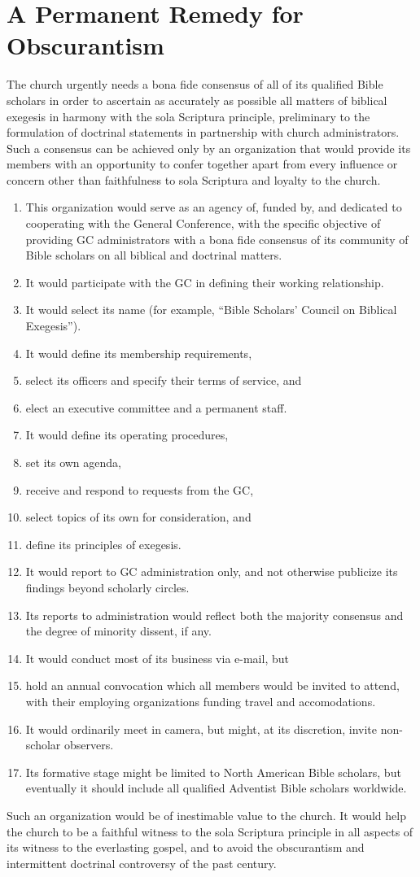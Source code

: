 \chapter{A Permanent Remedy for Obscurantism}
\label{ch:remedy}

The church urgently needs a bona fide consensus of all of its qualified
Bible scholars in order to ascertain as accurately as possible all matters
of biblical exegesis in harmony with the sola Scriptura principle, 
preliminary to the formulation of doctrinal statements in partnership with
church administrators. Such a consensus can be achieved only by an
organization that would provide its members with an opportunity to confer
together apart from every influence or concern other than faithfulness to
sola Scriptura and loyalty to the church.

\begin{enumerate}
\item This organization would serve as an agency of, funded by, and dedicated
to cooperating with the General Conference, with the specific objective of
providing GC administrators with a bona fide consensus of its community of
Bible scholars on all biblical and doctrinal matters. 
\item It would
participate with the GC in defining their working relationship. 
\item It would
select its name (for example, ``Bible Scholars' Council on Biblical
Exegesis''). 
\item It would define its membership requirements, 
\item select its
officers and specify their terms of service, and 
\item elect an executive
committee and a permanent staff. 
\item It would define its operating
procedures, 
\item set its own agenda, 
\item receive and respond to requests from
the GC, 
\item select topics of its own for consideration, and 
\item define its
principles of exegesis.
\item It would report to GC administration only, and not otherwise publicize
its findings beyond scholarly circles. 
\item Its reports to administration
would reflect both the majority consensus and the degree of minority
dissent, if any. 
\item It would conduct most of its business via e-mail, but
\item hold an annual convocation which all members would be invited to
attend, with their employing organizations funding travel and accomodations.
\item It would ordinarily meet in camera, but might, at its discretion,
invite non-scholar observers. 
\item Its formative stage might be limited to
North American Bible scholars, but eventually it should include all
qualified Adventist Bible scholars worldwide.
\end{enumerate}

Such an organization would be of inestimable value to the church. It would
help the church to be a faithful witness to the sola Scriptura principle in
all aspects of its witness to the everlasting gospel, and to avoid the
obscurantism and intermittent doctrinal controversy of the past century.
